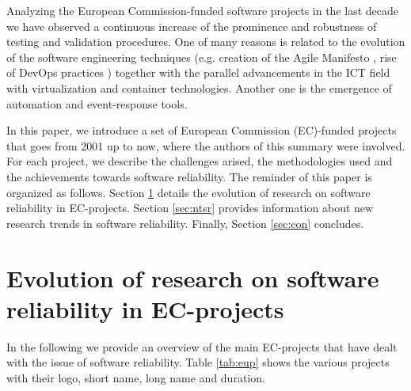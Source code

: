 \documentclass[journal]{IEEEtran}
\begin{document}
Analyzing the European Commission-funded software projects in the last decade
we have observed a continuous increase of the prominence and robustness of
testing and validation procedures. One of many reasons is related to the
evolution of the software engineering techniques (e.g. creation of the Agile
Manifesto \cite{agile-manifesto}, rise of DevOps practices \cite{zhu}) together
with the parallel advancements in the ICT field with virtualization and
container technologies. Another one is the emergence of automation and
event-response tools.

In this paper, we introduce a set of European Commission (EC)-funded projects
that goes from 2001 up to now, where the authors of this summary were involved.
For each project, we describe the challenges arised, the methodologies used and
the achievements towards software reliability. The reminder of this paper is
organized as follows. Section \ref{sec:ev} details the evolution of research on
software reliability in EC-projects. Section \ref{sec:ntsr} provides
information about new research trends in software reliability. Finally,
Section \ref{sec:con} concludes.

\section{Evolution of research on software reliability in EC-projects}
\label{sec:ev}

In the following we provide an overview of the main EC-projects that have dealt with the issue of software reliability. Table \ref{tab:eup} shows the various projects with their logo, short name, long name and duration.
\end{document}
